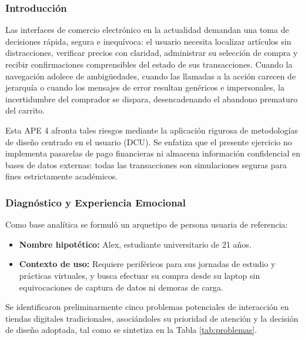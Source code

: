 \documentclass{article}
\begin{document}
\subsubsection{Introducción}
Las interfaces de comercio electrónico en la actualidad demandan una toma de decisiones rápida, segura e inequívoca: el usuario necesita localizar artículos sin distracciones, verificar precios con claridad, administrar su selección de compra y recibir confirmaciones comprensibles del estado de sus transacciones. Cuando la navegación adolece de ambigüedades, cuando las llamadas a la acción carecen de jerarquía o cuando los mensajes de error resultan genéricos e impersonales, la incertidumbre del comprador se dispara, desencadenando el abandono prematuro del carrito.

Esta APE 4 afronta tales riesgos mediante la aplicación rigurosa de metodologías de diseño centrado en el usuario (DCU). Se enfatiza que el presente ejercicio no implementa pasarelas de pago financieras ni almacena información confidencial en bases de datos externas: todas las transacciones son simulaciones seguras para fines estrictamente académicos.

\subsubsection{Diagnóstico y Experiencia Emocional}
Como base analítica se formuló un arquetipo de persona usuaria de referencia:
\begin{itemize}
    \item \textbf{Nombre hipotético:} Alex, estudiante universitario de 21 años.
    \item \textbf{Contexto de uso:} Requiere periféricos para sus jornadas de estudio y prácticas virtuales, y busca efectuar su compra desde su laptop sin equivocaciones de captura de datos ni demoras de carga.
\end{itemize}

Se identificaron preliminarmente cinco problemas potenciales de interacción en tiendas digitales tradicionales, asociándoles su prioridad de atención y la decisión de diseño adoptada, tal como se sintetiza en la Tabla \ref{tab:problemas}.
\end{document}

